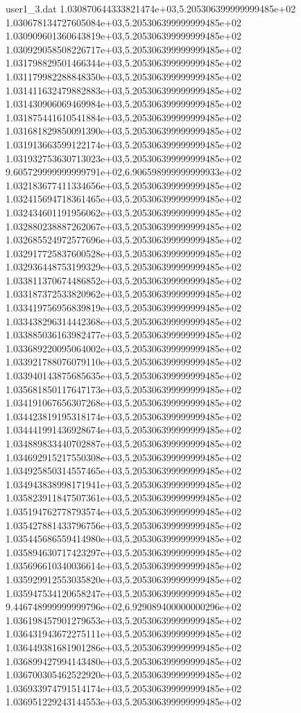 \begin{filecontents}{user1_3.dat}
1.030870644333821474e+03,5.205306399999999485e+02
1.030678134727605084e+03,5.205306399999999485e+02
1.030909601360643819e+03,5.205306399999999485e+02
1.030929058508226717e+03,5.205306399999999485e+02
1.031798829501466344e+03,5.205306399999999485e+02
1.031179982288848350e+03,5.205306399999999485e+02
1.031411632479882883e+03,5.205306399999999485e+02
1.031430906069469984e+03,5.205306399999999485e+02
1.031875441610541884e+03,5.205306399999999485e+02
1.031681829850091390e+03,5.205306399999999485e+02
1.031913663599122174e+03,5.205306399999999485e+02
1.031932753630713023e+03,5.205306399999999485e+02
9.605729999999999791e+02,6.906598999999999933e+02
1.032183677411334656e+03,5.205306399999999485e+02
1.032415694718361465e+03,5.205306399999999485e+02
1.032434601191956062e+03,5.205306399999999485e+02
1.032880238887262067e+03,5.205306399999999485e+02
1.032685524972577696e+03,5.205306399999999485e+02
1.032917725837600528e+03,5.205306399999999485e+02
1.032936448753199329e+03,5.205306399999999485e+02
1.033811370674486852e+03,5.205306399999999485e+02
1.033187372533820962e+03,5.205306399999999485e+02
1.033419756956839819e+03,5.205306399999999485e+02
1.033438296314442368e+03,5.205306399999999485e+02
1.033885036163982477e+03,5.205306399999999485e+02
1.033689220095064002e+03,5.205306399999999485e+02
1.033921788076079110e+03,5.205306399999999485e+02
1.033940143875685635e+03,5.205306399999999485e+02
1.035681850117647173e+03,5.205306399999999485e+02
1.034191067656307268e+03,5.205306399999999485e+02
1.034423819195318174e+03,5.205306399999999485e+02
1.034441991436928674e+03,5.205306399999999485e+02
1.034889833440702887e+03,5.205306399999999485e+02
1.034692915217550308e+03,5.205306399999999485e+02
1.034925850314557465e+03,5.205306399999999485e+02
1.034943838998171941e+03,5.205306399999999485e+02
1.035823911847507361e+03,5.205306399999999485e+02
1.035194762778793574e+03,5.205306399999999485e+02
1.035427881433796756e+03,5.205306399999999485e+02
1.035445686559414980e+03,5.205306399999999485e+02
1.035894630717423297e+03,5.205306399999999485e+02
1.035696610340036614e+03,5.205306399999999485e+02
1.035929912553035820e+03,5.205306399999999485e+02
1.035947534120658247e+03,5.205306399999999485e+02
9.446748999999999796e+02,6.929089400000000296e+02
1.036198457901279653e+03,5.205306399999999485e+02
1.036431943672275111e+03,5.205306399999999485e+02
1.036449381681901286e+03,5.205306399999999485e+02
1.036899427994143480e+03,5.205306399999999485e+02
1.036700305462522920e+03,5.205306399999999485e+02
1.036933974791514174e+03,5.205306399999999485e+02
1.036951229243144553e+03,5.205306399999999485e+02

\end{filecontents}
